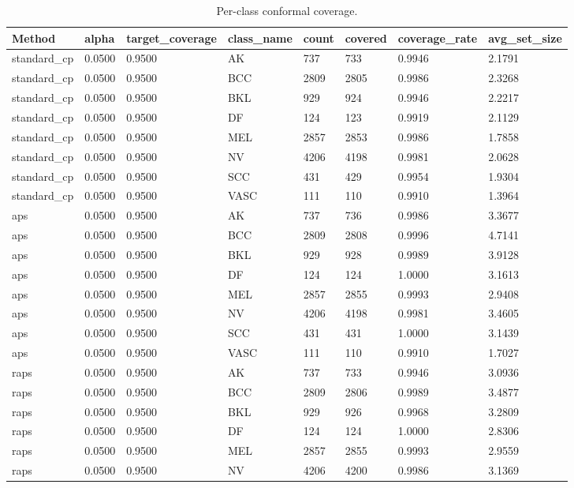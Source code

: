 \begin{table}[htbp]
\centering
\caption{Per-class conformal coverage.}
\label{tab:per\_class\_coverage}
\begin{tabular}{llllllll}
\hline
Method & alpha & target\_coverage & class\_name & count & covered & coverage\_rate & avg\_set\_size \\
\hline
standard\_cp & 0.0500 & 0.9500 & AK & 737 & 733 & 0.9946 & 2.1791 \\
standard\_cp & 0.0500 & 0.9500 & BCC & 2809 & 2805 & 0.9986 & 2.3268 \\
standard\_cp & 0.0500 & 0.9500 & BKL & 929 & 924 & 0.9946 & 2.2217 \\
standard\_cp & 0.0500 & 0.9500 & DF & 124 & 123 & 0.9919 & 2.1129 \\
standard\_cp & 0.0500 & 0.9500 & MEL & 2857 & 2853 & 0.9986 & 1.7858 \\
standard\_cp & 0.0500 & 0.9500 & NV & 4206 & 4198 & 0.9981 & 2.0628 \\
standard\_cp & 0.0500 & 0.9500 & SCC & 431 & 429 & 0.9954 & 1.9304 \\
standard\_cp & 0.0500 & 0.9500 & VASC & 111 & 110 & 0.9910 & 1.3964 \\
aps & 0.0500 & 0.9500 & AK & 737 & 736 & 0.9986 & 3.3677 \\
aps & 0.0500 & 0.9500 & BCC & 2809 & 2808 & 0.9996 & 4.7141 \\
aps & 0.0500 & 0.9500 & BKL & 929 & 928 & 0.9989 & 3.9128 \\
aps & 0.0500 & 0.9500 & DF & 124 & 124 & 1.0000 & 3.1613 \\
aps & 0.0500 & 0.9500 & MEL & 2857 & 2855 & 0.9993 & 2.9408 \\
aps & 0.0500 & 0.9500 & NV & 4206 & 4198 & 0.9981 & 3.4605 \\
aps & 0.0500 & 0.9500 & SCC & 431 & 431 & 1.0000 & 3.1439 \\
aps & 0.0500 & 0.9500 & VASC & 111 & 110 & 0.9910 & 1.7027 \\
raps & 0.0500 & 0.9500 & AK & 737 & 733 & 0.9946 & 3.0936 \\
raps & 0.0500 & 0.9500 & BCC & 2809 & 2806 & 0.9989 & 3.4877 \\
raps & 0.0500 & 0.9500 & BKL & 929 & 926 & 0.9968 & 3.2809 \\
raps & 0.0500 & 0.9500 & DF & 124 & 124 & 1.0000 & 2.8306 \\
raps & 0.0500 & 0.9500 & MEL & 2857 & 2855 & 0.9993 & 2.9559 \\
raps & 0.0500 & 0.9500 & NV & 4206 & 4200 & 0.9986 & 3.1369 \\

\end{tabular}
\end{table}
